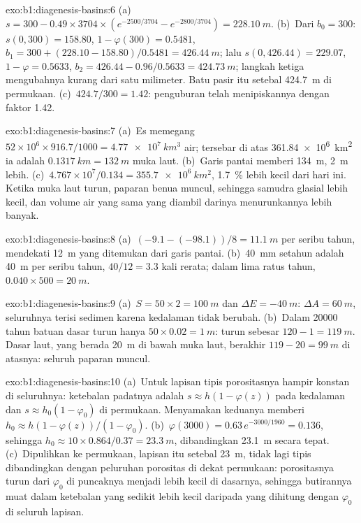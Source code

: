 \begin{solution}{exo:b1:diagenesis-basins:6}
(a)~$s = 300 - 0.49\times3704\times(e^{-2500/3704} - e^{-2800/3704}) =
\qty{228.10}{m}$. (b)~Dari $b_0 = 300$: $s(0, 300) = 158.80$, $1 - \varphi(300) =
0.5481$, $b_1 = 300 + (228.10 - 158.80)/0.5481 = \qty{426.44}{m}$; lalu $s(0, 426.44) = 229.07$, $1 - \varphi = 0.5633$, $b_2 = 426.44 - 0.96/0.5633 =
\qty{424.73}{m}$; langkah ketiga mengubahnya kurang dari satu milimeter. Batu pasir itu
setebal \qty{424.7}{m} di permukaan. (c)~$424.7/300 = 1.42$: penguburan telah
menipiskannya dengan faktor \num{1.42}.
\end{solution}

\begin{solution}{exo:b1:diagenesis-basins:7}
(a)~Es memegang $52\times10^6\times916.7/1000 = \qty{4.77e7}{km^3}$ air; tersebar di
atas \qty{361.84e6}{km^2} ia adalah $\qty{0.1317}{km} = \qty{132}{m}$ muka laut.
(b)~Garis pantai memberi \qty{134}{m}, \qty{2}{m} lebih. (c)~$4.767\times
10^7/0.134 = \qty{355.7e6}{km^2}$, \qty{1.7}{\%} lebih kecil dari hari ini. Ketika muka
laut turun, paparan benua muncul, sehingga samudra glasial lebih kecil, dan volume air
yang sama yang diambil darinya menurunkannya lebih banyak.
\end{solution}

\begin{solution}{exo:b1:diagenesis-basins:8}
(a)~$(-9.1 - (-98.1))/8 = \qty{11.1}{m}$ per seribu tahun, mendekati \qty{12}{m} yang
ditemukan dari garis pantai. (b)~\qty{40}{mm} setahun adalah \qty{40}{m} per seribu
tahun, $40/12 = 3.3$ kali rerata; dalam lima ratus tahun, $0.040\times500 = \qty{20}{m}$.
\end{solution}

\begin{solution}{exo:b1:diagenesis-basins:9}
(a)~$S = 50\times2 = \qty{100}{m}$ dan $\Delta E = \qty{-40}{m}$: $\Delta A = \qty{60}{m}$, seluruhnya terisi sedimen karena kedalaman tidak berubah. (b)~Dalam
\num{20000} tahun batuan dasar turun hanya $50\times0.02 = \qty{1}{m}$:  turun sebesar $120 - 1 = \qty{119}{m}$. Dasar laut, yang berada \qty{20}{m}
di bawah muka laut, berakhir $119 - 20 = \qty{99}{m}$ di atasnya: seluruh paparan muncul.
\end{solution}

\begin{solution}{exo:b1:diagenesis-basins:10}
(a)~Untuk lapisan tipis porositasnya hampir konstan di seluruhnya: ketebalan padatnya
adalah $s \approx h(1 - \varphi(z))$ pada kedalaman dan $s \approx h_0(1 -
\varphi_0)$ di permukaan. Menyamakan keduanya memberi $h_0 \approx h(1 -
\varphi(z))/(1 - \varphi_0)$. (b)~$\varphi(3000) = 0.63\,e^{-3000/1960} =
0.136$, sehingga $h_0 \approx 10\times0.864/0.37 = \qty{23.3}{m}$, dibandingkan
\qty{23.1}{m} secara tepat. (c)~Dipulihkan ke permukaan, lapisan itu setebal
\qty{23}{m}, tidak lagi tipis dibandingkan dengan peluruhan porositas di dekat
permukaan: porositasnya turun dari $\varphi_0$ di puncaknya menjadi lebih kecil di
dasarnya, sehingga butirannya muat dalam ketebalan yang sedikit lebih kecil daripada
yang dihitung dengan $\varphi_0$ di seluruh lapisan.
\end{solution}

